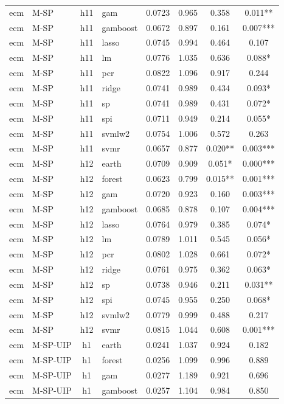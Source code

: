 \begin{ThreePartTable}
\begin{longtable}[t]{llclcccc}
ecm & M-SP & h11 & gam & 0.0723 & 0.965 & 0.358 & 0.011**\\
ecm & M-SP & h11 & gamboost & 0.0672 & 0.897 & 0.161 & 0.007***\\
ecm & M-SP & h11 & lasso & 0.0745 & 0.994 & 0.464 & 0.107\\
ecm & M-SP & h11 & lm & 0.0776 & 1.035 & 0.636 & 0.088*\\
ecm & M-SP & h11 & pcr & 0.0822 & 1.096 & 0.917 & 0.244\\
ecm & M-SP & h11 & ridge & 0.0741 & 0.989 & 0.434 & 0.093*\\
ecm & M-SP & h11 & sp & 0.0741 & 0.989 & 0.431 & 0.072*\\
ecm & M-SP & h11 & spi & 0.0711 & 0.949 & 0.214 & 0.055*\\
ecm & M-SP & h11 & svmlw2 & 0.0754 & 1.006 & 0.572 & 0.263\\
ecm & M-SP & h11 & svmr & 0.0657 & 0.877 & 0.020** & 0.003***\\
\addlinespace
ecm & M-SP & h12 & earth & 0.0709 & 0.909 & 0.051* & 0.000***\\
ecm & M-SP & h12 & forest & 0.0623 & 0.799 & 0.015** & 0.001***\\
ecm & M-SP & h12 & gam & 0.0720 & 0.923 & 0.160 & 0.003***\\
ecm & M-SP & h12 & gamboost & 0.0685 & 0.878 & 0.107 & 0.004***\\
ecm & M-SP & h12 & lasso & 0.0764 & 0.979 & 0.385 & 0.074*\\
ecm & M-SP & h12 & lm & 0.0789 & 1.011 & 0.545 & 0.056*\\
ecm & M-SP & h12 & pcr & 0.0802 & 1.028 & 0.661 & 0.072*\\
ecm & M-SP & h12 & ridge & 0.0761 & 0.975 & 0.362 & 0.063*\\
ecm & M-SP & h12 & sp & 0.0738 & 0.946 & 0.211 & 0.031**\\
ecm & M-SP & h12 & spi & 0.0745 & 0.955 & 0.250 & 0.068*\\
ecm & M-SP & h12 & svmlw2 & 0.0779 & 0.999 & 0.488 & 0.217\\
ecm & M-SP & h12 & svmr & 0.0815 & 1.044 & 0.608 & 0.001***\\
\addlinespace
ecm & M-SP-UIP & h1 & earth & 0.0241 & 1.037 & 0.924 & 0.182\\
ecm & M-SP-UIP & h1 & forest & 0.0256 & 1.099 & 0.996 & 0.889\\
ecm & M-SP-UIP & h1 & gam & 0.0277 & 1.189 & 0.921 & 0.696\\
ecm & M-SP-UIP & h1 & gamboost & 0.0257 & 1.104 & 0.984 & 0.850\\

\end{longtable}
\end{ThreePartTable}
